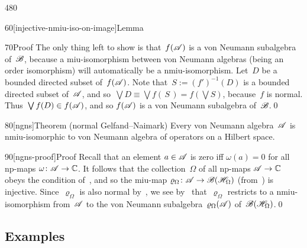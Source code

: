 \begin{parsec}{480}
\begin{point}{60}[injective-nmiu-iso-on-image]{Lemma}
\begin{point}{70}{Proof}
The only thing left to show is that~$f(\mathscr{A})$
is a von Neumann subalgebra of~$\mathscr{B}$,
because a miu-isomorphism between von Neumann algebras
(being an order isomorphism)
will automatically be a nmiu-isomorphism.
Let~$D$ be a bounded directed subset of~$f(\mathscr{A})$.
Note that~$S:=(f')^{-1}(D)$ is a bounded
directed subset of~$\mathscr{A}$,
and so~$\bigvee D\equiv  \bigvee f(\,S\,)
= f(\bigvee S)$, because~$f$ is normal.
Thus~$\bigvee f(D)\in f(\mathscr{A})$,
and so $f(\mathscr{A})$ is a von Neumann subalgebra of~$\mathscr{B}$.\qed
\end{point}
\end{point}
\begin{point}{80}[ngns]{Theorem (normal Gelfand--Naimark)}%
%
Every von Neumann algebra~$\mathscr{A}$ is nmiu-isomorphic
to von Neumann algebra of operators on a Hilbert space.
\begin{point}{90}[ngns-proof]{Proof}%
Recall that an element $a\in \mathscr{A}$ is zero iff $\omega(a)=0$
for all np-maps $\omega\colon \mathscr{A}\to\mathbb{C}$.
It follows that the collection~$\Omega$
of all np-maps $\mathscr{A}\to\mathbb{C}$
obeys the condition of~,
and so the miu-map $\varrho_\Omega\colon \mathscr{A}\to\mathscr{B}(\mathscr{H}_\Omega)$
(from~)
is injective.
Since~$\varrho_\Omega$
is also normal by~,
we see by~ that~$\varrho_\Omega$
restricts to a nmiu-isomorphism
from~$\mathscr{A}$ to the von Neumann subalgebra~$\varrho_\Omega(\mathscr{A})$
of~$\mathscr{B}(\mathscr{H}_\Omega)$.\qed
\end{point}
\end{point}
\end{parsec}
\subsection{Examples}
